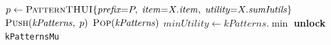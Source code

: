 \begin{algorithm}[H]
\caption{Thread-Safe Top-$k$ Heap Push
  (\texttt{saveSafe}, \texttt{pthui.go} lines 933--959)}
\label{alg:pthui-savesafe}
\begin{algorithmic}[1]
  \State $p \leftarrow \textsc{PatternTHUI}\{
         \mathit{prefix}{=}P,\;
         \mathit{item}{=}X.\mathit{item},\;
         \mathit{utility}{=}X.\mathit{sumIutils}\}$
  \State {}
         \hfill{}
  \State $\textsc{Push}(\mathit{kPatterns},\;p)$
        $\textsc{Pop}(\mathit{kPatterns})$
      \EndWhile
    \EndIf
    \State $\mathit{minUtility} \leftarrow \mathit{kPatterns}.\min$
           \hfill{}
  \EndIf
  \State \textbf{unlock} \texttt{kPatternsMu}
\EndProcedure
\end{algorithmic}
\end{algorithm}

